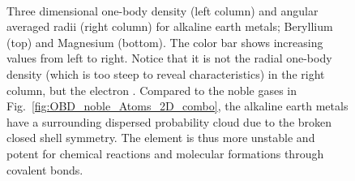 \begin{figure}
\begin{center}
     \\
   \vspace{0.5cm}
   \vspace{0.5cm}
  \caption{Three dimensional one-body density (left column) and angular averaged radii (right column) for alkaline earth metals; Beryllium (top) and Magnesium (bottom). The color bar shows increasing values from left to right. Notice that it is not the radial one-body density (which is too steep to reveal characteristics) in the right column, but the electron . Compared to the noble gases in Fig.~\ref{fig:OBD_noble_Atoms_2D_combo}, the alkaline earth metals have a surrounding dispersed probability cloud due to the broken closed shell symmetry. The element is thus more unstable and potent for chemical reactions and molecular formations through covalent bonds.}
  \label{fig:OBD_alkaline_Atoms_2D_combo}
 \end{center}
\end{figure}
 
 
 

